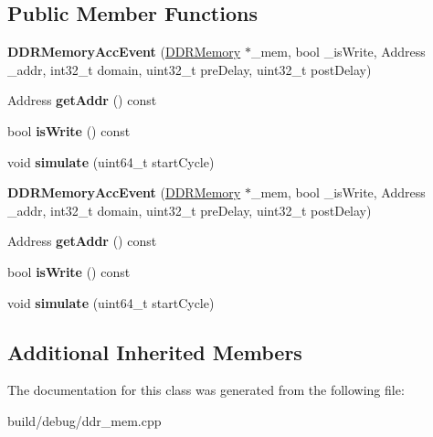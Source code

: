 \subsection*{Public Member Functions}
\begin{DoxyCompactItemize}
\item 
\hypertarget{classDDRMemoryAccEvent_a8ca6f7b51d74fa2f2b83935aaf8e55e8}{{\bfseries D\-D\-R\-Memory\-Acc\-Event} (\hyperlink{classDDRMemory}{D\-D\-R\-Memory} $\ast$\-\_\-mem, bool \-\_\-is\-Write, Address \-\_\-addr, int32\-\_\-t domain, uint32\-\_\-t pre\-Delay, uint32\-\_\-t post\-Delay)}\label{classDDRMemoryAccEvent_a8ca6f7b51d74fa2f2b83935aaf8e55e8}

\item 
\hypertarget{classDDRMemoryAccEvent_a9027a4ac2269ed13a4d7413757603608}{Address {\bfseries get\-Addr} () const }\label{classDDRMemoryAccEvent_a9027a4ac2269ed13a4d7413757603608}

\item 
\hypertarget{classDDRMemoryAccEvent_a8599665610dfb9a19724f8286f97e4ca}{bool {\bfseries is\-Write} () const }\label{classDDRMemoryAccEvent_a8599665610dfb9a19724f8286f97e4ca}

\item 
\hypertarget{classDDRMemoryAccEvent_ae37e788bac980a59b318cdabcf53e817}{void {\bfseries simulate} (uint64\-\_\-t start\-Cycle)}\label{classDDRMemoryAccEvent_ae37e788bac980a59b318cdabcf53e817}

\item 
\hypertarget{classDDRMemoryAccEvent_a8ca6f7b51d74fa2f2b83935aaf8e55e8}{{\bfseries D\-D\-R\-Memory\-Acc\-Event} (\hyperlink{classDDRMemory}{D\-D\-R\-Memory} $\ast$\-\_\-mem, bool \-\_\-is\-Write, Address \-\_\-addr, int32\-\_\-t domain, uint32\-\_\-t pre\-Delay, uint32\-\_\-t post\-Delay)}\label{classDDRMemoryAccEvent_a8ca6f7b51d74fa2f2b83935aaf8e55e8}

\item 
\hypertarget{classDDRMemoryAccEvent_a9027a4ac2269ed13a4d7413757603608}{Address {\bfseries get\-Addr} () const }\label{classDDRMemoryAccEvent_a9027a4ac2269ed13a4d7413757603608}

\item 
\hypertarget{classDDRMemoryAccEvent_a8599665610dfb9a19724f8286f97e4ca}{bool {\bfseries is\-Write} () const }\label{classDDRMemoryAccEvent_a8599665610dfb9a19724f8286f97e4ca}

\item 
\hypertarget{classDDRMemoryAccEvent_ae37e788bac980a59b318cdabcf53e817}{void {\bfseries simulate} (uint64\-\_\-t start\-Cycle)}\label{classDDRMemoryAccEvent_ae37e788bac980a59b318cdabcf53e817}

\end{DoxyCompactItemize}
\subsection*{Additional Inherited Members}


The documentation for this class was generated from the following file\-:\begin{DoxyCompactItemize}
\item 
build/debug/ddr\-\_\-mem.\-cpp\end{DoxyCompactItemize}
